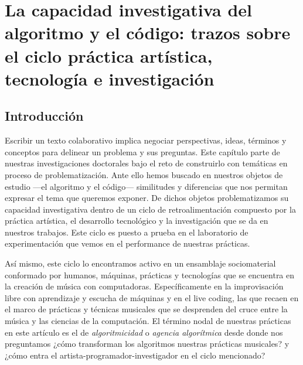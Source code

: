 \chapter{La capacidad investigativa del algoritmo y el código: trazos sobre el ciclo práctica artística, tecnología e investigación}

\author{Aaron Escobar Castañeda y Hernani Villaseñor Ramírez}

\section{Introducción}
Escribir un texto colaborativo implica negociar perspectivas, ideas, términos y conceptos para delinear un problema y sus preguntas. Este capítulo parte de nuestras investigaciones doctorales bajo el reto de construirlo con temáticas en proceso de problematización. Ante ello hemos buscado en nuestros objetos de estudio ---el algoritmo y el código--- similitudes y diferencias que nos permitan expresar el tema que queremos exponer. De dichos objetos problematizamos su capacidad investigativa dentro de un ciclo de retroalimentación compuesto por la práctica artística, el desarrollo tecnológico y la investigación que se da en nuestros trabajos. Este ciclo es puesto a prueba en el laboratorio de experimentación que vemos en el performance de nuestras prácticas.

Así mismo, este ciclo lo encontramos activo en un ensamblaje sociomaterial conformado por humanos, máquinas, prácticas y tecnologías que se encuentra en la creación de música con computadoras. Específicamente en la improvisación libre con aprendizaje y escucha de máquinas y en el live coding, las que recaen en el marco de prácticas y técnicas musicales que se desprenden del cruce entre la música y las ciencias de la computación. El término nodal de nuestras prácticas en este artículo es el de \emph{ algoritmicidad} o \emph{agencia algorítmica} desde donde nos preguntamos ¿cómo transforman los algoritmos nuestras prácticas musicales? y ¿cómo entra el artista-programador-investigador en el ciclo mencionado?

